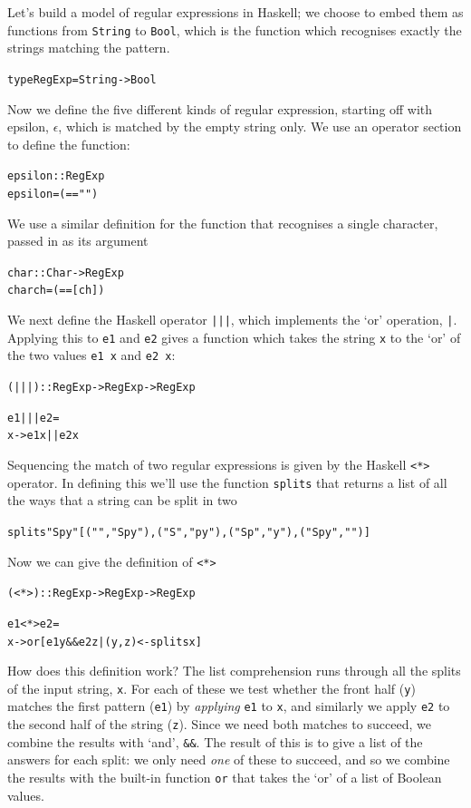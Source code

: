 \medskip
\noindent
Let's build a model of regular expressions in Haskell; we choose to embed them as functions from \texttt{String} to \texttt{Bool}, which is the function which recognises exactly the strings matching the pattern.
\begin{alltt}
type RegExp = String -> Bool
\end{alltt}
Now we define the five different kinds of regular expression, starting off with epsilon, $\epsilon$, which is matched by the empty string only. We use an operator section to define the function:
\begin{alltt}
epsilon :: RegExp
epsilon = (=="")
\end{alltt}
We use a similar definition for the function that recognises a single character, passed in as its argument
\begin{alltt}
char :: Char -> RegExp
char ch = (==[ch])
\end{alltt}
We next define the Haskell operator \texttt{|||}, which implements the `or' operation, \texttt{|}. Applying this to \texttt{e1} and \texttt{e2} gives a function which takes the string \texttt{x} to the `or' of the two values \texttt{e1 x} and \texttt{e2 x}: 
\begin{alltt}
(|||) :: RegExp -> RegExp -> RegExp

e1 ||| e2 = 
    \bs{}x -> e1 x || e2 x
\end{alltt}
Sequencing the match of two regular expressions is given by the Haskell \texttt{<*>} operator. In defining this we'll use the function \texttt{splits} that returns a list of all the ways that a string can be split in two
\begin{alltt}
splits "Spy" \step{}[("","Spy"),("S","py"),("Sp","y"),("Spy","")]
\end{alltt}
Now we can give the definition of \texttt{<*>}\minx{<*>}
\begin{alltt}
(<*>) :: RegExp -> RegExp ->  RegExp

e1 <*> e2 =
    \bs{}x -> or [ e1 y && e2 z | (y,z) <- splits x ]
\end{alltt}
How does this definition work? The list comprehension runs through all the splits of the input string, \texttt{x}. For each of these we test whether the front half (\texttt{y}) matches the first pattern (\texttt{e1}) by \emph{applying} \texttt{e1} to \texttt{x}, and similarly we apply \texttt{e2} to the second half of the string (\texttt{z}). Since we need both matches to succeed, we combine the results with `and', \texttt{\&\&}. The result of this is to give a list of the answers for each split: we only need \emph{one} of these to succeed, and so we combine the results with the built-in function \texttt{or} that takes the `or' of a list of Boolean values. 

